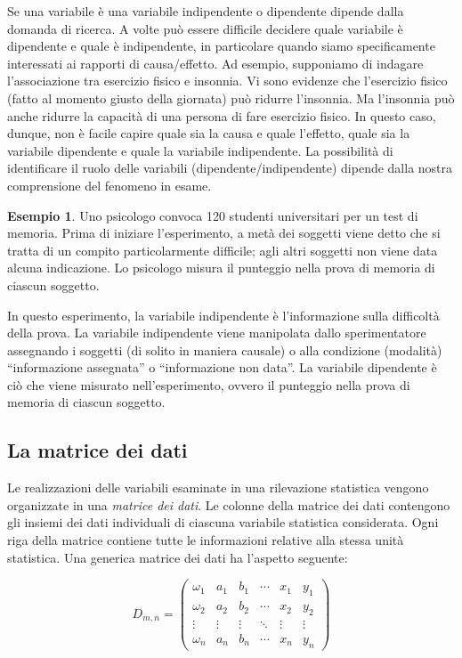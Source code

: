 \documentclass[
]{book}
\theoremstyle{definition}
\theoremstyle{definition}
\newtheorem{example}{Esempio}
\theoremstyle{definition}
\theoremstyle{definition}
\theoremstyle{remark}
\begin{document}
Se una variabile è una variabile indipendente o dipendente dipende dalla domanda di ricerca. A volte può essere difficile decidere quale variabile è dipendente e quale è indipendente, in particolare quando siamo specificamente interessati ai rapporti di causa/effetto. Ad esempio, supponiamo di indagare l'associazione tra esercizio fisico e insonnia. Vi sono evidenze che l'esercizio fisico (fatto al momento giusto della giornata) può ridurre l'insonnia. Ma l'insonnia può anche ridurre la capacità di una persona di fare esercizio fisico. In questo caso, dunque, non è facile capire quale sia la causa e quale l'effetto, quale sia la variabile dipendente e quale la variabile indipendente. La possibilità di identificare il ruolo delle variabili (dipendente/indipendente) dipende dalla nostra comprensione del fenomeno in esame.

\begin{example}
Uno psicologo convoca 120 studenti universitari per un test di memoria.
Prima di iniziare l'esperimento, a metà dei soggetti viene detto che si
tratta di un compito particolarmente difficile; agli altri soggetti non
viene data alcuna indicazione. Lo psicologo misura il punteggio nella
prova di memoria di ciascun soggetto.

In questo esperimento, la variabile indipendente è l'informazione sulla difficoltà della prova. La variabile indipendente viene manipolata dallo sperimentatore assegnando i soggetti (di solito in maniera causale) o alla condizione (modalità) ``informazione assegnata'' o ``informazione non data''. La
variabile dipendente è ciò che viene misurato nell'esperimento, ovvero
il punteggio nella prova di memoria di ciascun soggetto.
\end{example}

\hypertarget{la-matrice-dei-dati}{%
\subsection{La matrice dei dati}\label{la-matrice-dei-dati}}

Le realizzazioni delle variabili esaminate in una rilevazione statistica
vengono organizzate in una \emph{matrice dei dati}. Le colonne della matrice
dei dati contengono gli insiemi dei dati individuali di ciascuna
variabile statistica considerata. Ogni riga della matrice contiene tutte
le informazioni relative alla stessa unità statistica. Una generica
matrice dei dati ha l'aspetto seguente:

\[
D_{m,n} = 
 \begin{pmatrix}
  \omega_1 & a_{1}   & b_{1}   & \cdots & x_{1} & y_{1}\\
  \omega_2 & a_{2}   & b_{2}   & \cdots & x_{2} & y_{2}\\
  \vdots   & \vdots  & \vdots  & \ddots & \vdots & \vdots  \\
 \omega_n  & a_{n}   & b_{n}   & \cdots & x_{n} & y_{n}
 \end{pmatrix}
 \]
\end{document}
